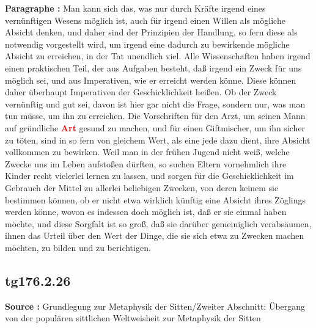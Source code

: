 \documentclass[a4paper,12pt,twoside]{book}
\newcommand{\match}[1]{\textcolor{red}{\textbf{#1}}}
\begin{document}
	\noindent\textbf{Paragraphe : }Man kann sich das, was nur durch Kräfte irgend eines vernünftigen Wesens möglich ist, auch für irgend einen Willen als mögliche Absicht denken, und daher sind der Prinzipien der Handlung, so fern diese als notwendig vorgestellt wird, um irgend eine dadurch zu bewirkende mögliche Absicht zu erreichen, in der Tat unendlich viel. Alle Wissenschaften haben irgend einen praktischen Teil, der aus Aufgaben besteht, daß irgend ein Zweck für uns möglich sei, und aus Imperativen, wie er erreicht werden könne. Diese können daher überhaupt Imperativen der Geschicklichkeit heißen. Ob der Zweck vernünftig und gut sei, davon ist hier gar nicht die Frage, sondern nur, was man tun müsse, um ihn zu erreichen. Die Vorschriften für den Arzt, um seinen Mann auf gründliche \match{Art} gesund zu machen, und für einen Giftmischer, um ihn sicher zu töten, sind in so fern von gleichem Wert, als eine jede dazu dient, ihre Absicht vollkommen zu bewirken. Weil man in der frühen Jugend nicht weiß, welche Zwecke uns im Leben aufstoßen dürften, so suchen Eltern vornehmlich ihre Kinder recht vielerlei lernen zu lassen, und sorgen für die Geschicklichkeit im Gebrauch der Mittel zu allerlei beliebigen Zwecken, von deren keinem sie bestimmen können, ob er nicht etwa wirklich künftig eine Absicht ihres Zöglings werden könne, wovon es indessen doch möglich ist, daß er sie einmal haben möchte, und diese Sorgfalt ist so groß, daß sie darüber gemeiniglich verabsäumen, ihnen das Urteil über den Wert der Dinge, die sie sich etwa zu Zwecken machen möchten, zu bilden und zu berichtigen. 
	
	\subsection*{tg176.2.26} 
	\textbf{Source : }Grundlegung zur Metaphysik der Sitten/Zweiter Abschnitt: Übergang von der populären sittlichen Weltweisheit zur Metaphysik der Sitten\\  
	
\end{document}
